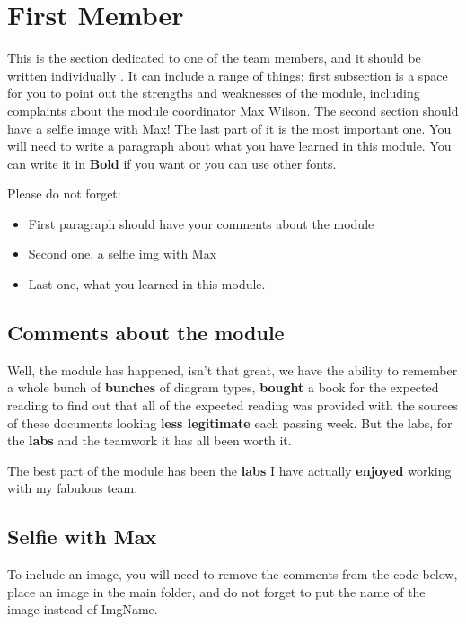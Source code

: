 
\section{First Member}
This is the section dedicated to one of the team members, and it should be written individually . It can include a range of things; first subsection is a space for you to point out the strengths and weaknesses of the module, including complaints about the module coordinator Max Wilson. The second section should have a selfie image with Max! The last part of it is the most important one. You will need to write a paragraph about what you have learned in this module. You can write it in \textbf{Bold} if you want or you can use other fonts. 

Please do not forget:
\begin{itemize}
	\item First paragraph should have your comments about the module
	\item Second one, a selfie img with Max
	\item Last one, what you learned in this module.
\end{itemize}

\subsection{Comments about the module}

Well, the module has happened, isn't that great, we have the ability to remember a whole bunch of \textbf{bunches} of diagram types, \textbf{bought} a book for the expected reading to find out that all of the expected reading was provided with the sources of these documents looking \textbf{less legitimate} each passing week. But the labs, for the \textbf{labs} and the teamwork it has all been worth it.

The best part of the module has been the \textbf{labs} I have actually \textbf{enjoyed} working with my {fabulous} team. 

\subsection{Selfie with Max}

To include an image, you will need to remove the comments from the code below, place an image in the main folder, and do not forget to put the name of the image instead of ImgName. 


